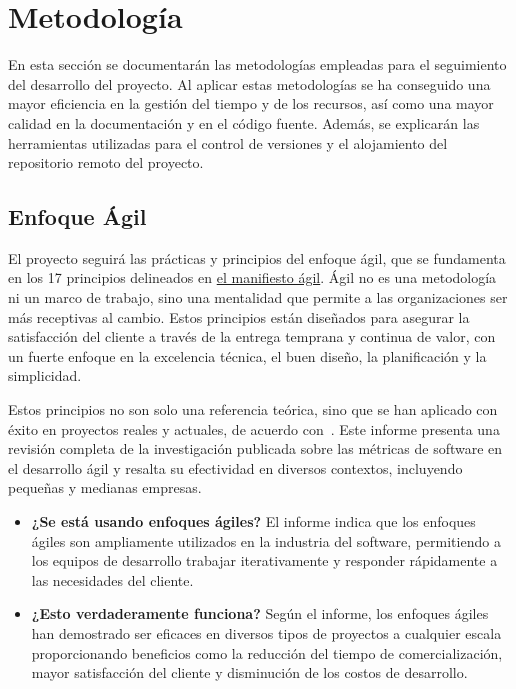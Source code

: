 \chapter{Metodología}

En esta sección se documentarán las metodologías empleadas para el seguimiento del desarrollo del proyecto. Al aplicar estas metodologías se ha conseguido una mayor eficiencia en la gestión del tiempo y de los recursos, así como una mayor calidad en la documentación y en el código fuente. Además, se explicarán las herramientas utilizadas para el control de versiones y el alojamiento del repositorio remoto del proyecto.

\section{Enfoque Ágil}

El proyecto seguirá las prácticas y principios del enfoque ágil, que se fundamenta en los 17 principios delineados en \href{https://agilemanifesto.org/iso/es/manifesto.html}{el manifiesto ágil}. Ágil no es una metodología ni un marco de trabajo, sino una mentalidad que permite a las organizaciones ser más receptivas al cambio. Estos principios están diseñados para asegurar la satisfacción del cliente a través de la entrega temprana y continua de valor, con un fuerte enfoque en la excelencia técnica, el buen diseño, la planificación y la simplicidad.

Estos principios no son solo una referencia teórica, sino que se han aplicado con éxito en proyectos reales y actuales, de acuerdo con~\cite{berlas2024software}. Este informe presenta una revisión completa de la investigación publicada sobre las métricas de software en el desarrollo ágil y resalta su efectividad en diversos contextos, incluyendo pequeñas y medianas empresas.

\begin{itemize}
    \item \textbf{¿Se está usando enfoques ágiles?} El informe indica que los enfoques ágiles son ampliamente utilizados en la industria del software, permitiendo a los equipos de desarrollo trabajar iterativamente y responder rápidamente a las necesidades del cliente.
    \item \textbf{¿Esto verdaderamente funciona?} Según el informe, los enfoques ágiles han demostrado ser eficaces en diversos tipos de proyectos a cualquier escala proporcionando beneficios como la reducción del tiempo de comercialización, mayor satisfacción del cliente y disminución de los costos de desarrollo.
\end{itemize}

